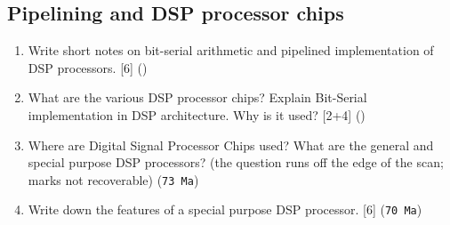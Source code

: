 \documentclass[12pt]{article}
\begin{document}
  \subsection{Pipelining and DSP processor chips}
    \begin{enumerate}[topsep=0pt, noitemsep]
      \item Write short notes on bit-serial arithmetic and pipelined implementation of DSP processors. \hfill [6] ()
      \item What are the various DSP processor chips? Explain Bit-Serial implementation in DSP architecture. Why is it used? \hfill [2+4] ()
      \item Where are Digital Signal Processor Chips used? What are the general and special purpose DSP processors? \hfill (the question runs off the edge of the scan; marks not recoverable) (\texttt{73 Ma})
      \item Write down the features of a special purpose DSP processor. \hfill [6] (\texttt{70 Ma})
    \end{enumerate}
\end{document}
